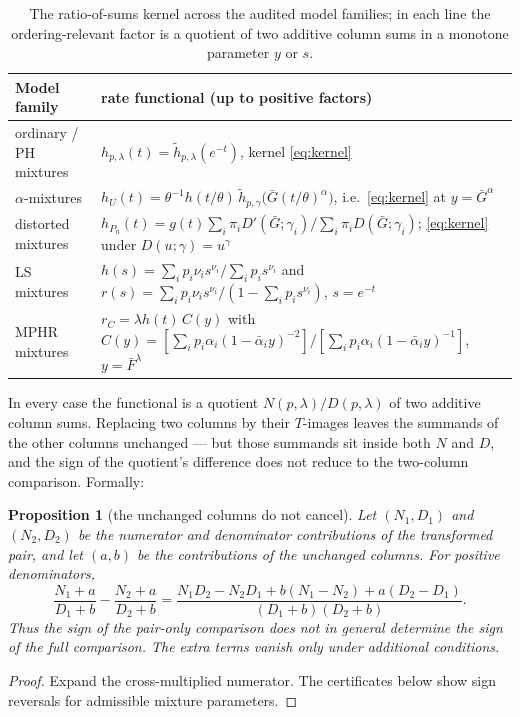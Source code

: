 \documentclass[10pt]{article}
\theoremstyle{plain}
\newtheorem{proposition}[theorem]{Proposition}
\theoremstyle{definition}
\theoremstyle{remark}
\begin{document}
\begin{table}[h]
\centering\footnotesize
\caption{The ratio-of-sums kernel across the audited model families; in each line the ordering-relevant factor is a quotient of two additive column sums in a monotone parameter $y$ or $s$.}
\label{tab:kernels}
\begin{tabular}{@{}p{4.9cm} p{10.2cm}@{}}
\toprule
Model family & rate functional (up to positive factors) \\
\midrule
ordinary / PH mixtures & $h_{p,\lambda}(t)=\tilde h_{p,\lambda}(e^{-t})$, kernel \eqref{eq:kernel} \\
$\alpha$-mixtures \cite{ShojaeeAsadiFinkelstein2022,SahooKayalFinkelstein2026} & $h_U(t)=\theta^{-1}h(t/\theta)\,\tilde h_{p,\gamma}\bigl(\bar G(t/\theta)^\alpha\bigr)$, i.e.\ \eqref{eq:kernel} at $y=\bar G^\alpha$ \\
distorted mixtures \cite{ShekariEtAl2026} & $h_{P_n}(t)=g(t)\sum_i\pi_iD'(\bar G;\gamma_i)/\sum_i\pi_iD(\bar G;\gamma_i)$; \eqref{eq:kernel} under $D(u;\gamma)=u^\gamma$ \\
LS mixtures \cite{BarmalzanKosariBalakrishnan2022,BhaktaKayalFinkelstein2024,VargheseEtAl2025} & $h(s)=\sum_ip_i\nu_i s^{\nu_i}/\sum_ip_i s^{\nu_i}$ and $r(s)=\sum_ip_i\nu_i s^{\nu_i}/(1-\sum_ip_i s^{\nu_i})$, $s=e^{-t}$ \\
MPHR mixtures \cite{GuoYan2024,SahooKayalBalakrishnan2026} & $r_C=\lambda h(t)\,C(y)$ with $C(y)=[\sum_ip_i\alpha_i(1-\bar\alpha_i y)^{-2}]/[\sum_ip_i\alpha_i(1-\bar\alpha_i y)^{-1}]$, $y=\bar F^\lambda$ \\
\bottomrule
\end{tabular}
\end{table}

In every case the functional is a quotient $N(p,\lambda)/D(p,\lambda)$ of two additive column sums. Replacing two columns by their $T$-images leaves the summands of the other columns unchanged --- but those summands sit inside both $N$ and $D$, and the sign of the quotient's difference does not reduce to the two-column comparison. Formally:

\begin{proposition}[the unchanged columns do not cancel]\label{prop:nonsep}
Let $(N_1,D_1)$ and $(N_2,D_2)$ be the numerator and denominator contributions of the transformed pair, and let $(a,b)$ be the contributions of the unchanged columns. For positive denominators,
\[
\frac{N_1+a}{D_1+b}-\frac{N_2+a}{D_2+b}
=\frac{N_1D_2-N_2D_1+b(N_1-N_2)+a(D_2-D_1)}{(D_1+b)(D_2+b)}.
\]
Thus the sign of the pair-only comparison does not in general determine the sign of the full comparison. The extra terms vanish only under additional conditions.
\end{proposition}
\begin{proof}
Expand the cross-multiplied numerator. The certificates below show sign reversals for admissible mixture parameters.
\end{proof}
\end{document}
